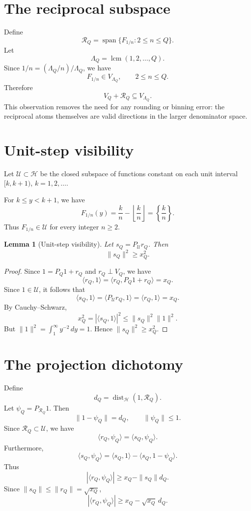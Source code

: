 \documentclass[11pt]{article}
\newtheorem{lemma}{Lemma}
\newcommand{\Hcal}{\mathcal H}
\newcommand{\Ucal}{\mathcal U}
\newcommand{\Rcal}{\mathcal R}
\newcommand{\dist}{\operatorname{dist}}
\newcommand{\lcm}{\operatorname{lcm}}
\newcommand{\Span}{\operatorname{span}}
\begin{document}
\section{The reciprocal subspace}

Define
\[
\Rcal_Q=\Span\{F_{1/n}:2\le n\le Q\}.
\]
Let
\[
\Lambda_Q=\lcm(1,2,\dots,Q).
\]
Since $1/n=(\Lambda_Q/n)/\Lambda_Q$, we have
\[
F_{1/n}\in V_{\Lambda_Q},\qquad 2\le n\le Q.
\]
Therefore
\[
V_Q+\Rcal_Q\subseteq V_{\Lambda_Q}.
\]
This observation removes the need for any rounding or binning error: the reciprocal atoms themselves are valid directions in the larger denominator space.

\section{Unit-step visibility}

Let $\Ucal\subset \Hcal$ be the closed subspace of functions constant on each unit interval $[k,k+1)$, $k=1,2,\dots$.

For $k\le y<k+1$, we have
\[
F_{1/n}(y)=\frac{k}{n}-\left\lfloor\frac{k}{n}\right\rfloor=\left\{\frac{k}{n}\right\}.
\]
Thus $F_{1/n}\in\Ucal$ for every integer $n\ge2$.

\begin{lemma}[Unit-step visibility]
Let $s_Q=P_{\Ucal}r_Q$. Then
\[
\|s_Q\|^2\ge x_Q^2.
\]
\end{lemma}

\begin{proof}
Since $1=P_Q1+r_Q$ and $r_Q\perp V_Q$, we have
\[
\langle r_Q,1\rangle=\langle r_Q,P_Q1+r_Q\rangle=x_Q.
\]
Since $1\in\Ucal$, it follows that
\[
\langle s_Q,1\rangle=\langle P_{\Ucal}r_Q,1\rangle=\langle r_Q,1\rangle=x_Q.
\]
By Cauchy--Schwarz,
\[
x_Q^2=|\langle s_Q,1\rangle|^2\le \|s_Q\|^2\|1\|^2.
\]
But $\|1\|^2=\int_1^\infty y^{-2}\,dy=1$. Hence $\|s_Q\|^2\ge x_Q^2$.
\end{proof}

\section{The projection dichotomy}

Define
\[
d_Q=\dist_{\Hcal}(1,\Rcal_Q).
\]
Let $\psi_Q=P_{\Rcal_Q}1$. Then
\[
\|1-\psi_Q\|=d_Q,\qquad \|\psi_Q\|\le 1.
\]
Since $\Rcal_Q\subset \Ucal$, we have
\[
\langle r_Q,\psi_Q\rangle=\langle s_Q,\psi_Q\rangle.
\]
Furthermore,
\[
\langle s_Q,\psi_Q\rangle=\langle s_Q,1\rangle-\langle s_Q,1-\psi_Q\rangle.
\]
Thus
\[
|\langle r_Q,\psi_Q\rangle|\ge x_Q-\|s_Q\|d_Q.
\]
Since $\|s_Q\|\le\|r_Q\|=\sqrt{x_Q}$,
\[
|\langle r_Q,\psi_Q\rangle|\ge x_Q-\sqrt{x_Q}\,d_Q.
\]
\end{document}

